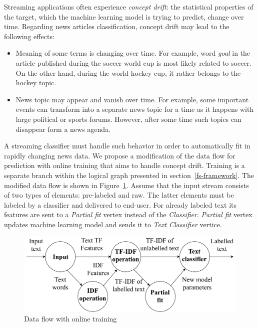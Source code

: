 Streaming applications often experience {\em concept drift}: the statistical properties of the target, which the machine learning model is trying to predict, change over time. Regarding news articles classification, concept drift may lead to the following effects:

\begin{itemize}
    \item Meaning of some terms is changing over time. For example, word {\em goal} in the article published during the soccer world cup is most likely related to soccer. On the other hand, during the world hockey cup, it rather belongs to the hockey topic.
    \item News topic may appear and vanish over time. For example, some important events can transform into a separate news topic for a time as it happens with large political or sports forums. However, after some time such topics can disappear form a news agenda.
\end{itemize}

A streaming classifier must handle such behavior in order to automatically fit in rapidly changing news data. We propose a modification of the data flow for prediction with online training that aims to handle concept drift. Training is a separate branch within the logical graph presented in section~\ref{fs-framework}. The modified data flow is shown in Figure~\ref{training_graph}. Assume that the input stream consists of two types of elements: pre-labeled and raw. The latter elements must be labeled by a classifier and delivered to end-user. For already labeled text its features are sent to a {\em Partial fit} vertex instead of the {\em Classifier}. {\em Partial fit} vertex updates machine learning model and sends it to {\em Text Classifier} vertice.

\begin{figure}[htbp]
  \centering
  \includegraphics[scale=0.38]{pics/logical-graph}
  \caption{Data flow with online training}
  \label {training_graph}
\end{figure}

